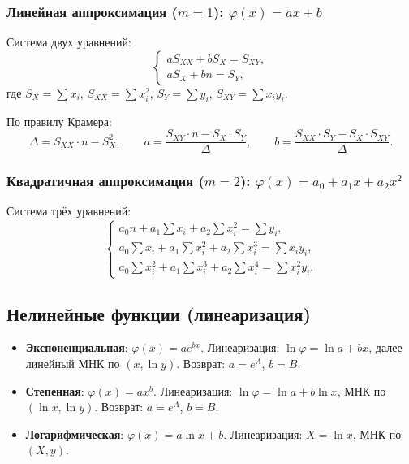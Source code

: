 \documentclass[a4paper,12pt]{article}
\begin{document}
\subsubsection{Линейная аппроксимация ($m=1$): $\varphi(x) = ax + b$}

Система двух уравнений:
\[
\begin{cases}
a S_{XX} + b S_X = S_{XY}, \\
a S_X + b n = S_Y,
\end{cases}
\]
где $S_X = \sum x_i$, $S_{XX} = \sum x_i^2$, $S_Y = \sum y_i$, $S_{XY} = \sum x_i y_i$.

По правилу Крамера:
\[
    \Delta = S_{XX}\cdot n - S_X^2, \qquad
    a = \frac{S_{XY}\cdot n - S_X\cdot S_Y}{\Delta}, \qquad
    b = \frac{S_{XX}\cdot S_Y - S_X\cdot S_{XY}}{\Delta}.
\]

\subsubsection{Квадратичная аппроксимация ($m=2$): $\varphi(x) = a_0 + a_1 x + a_2 x^2$}

Система трёх уравнений:
\[
\begin{cases}
a_0 n + a_1 \sum x_i + a_2 \sum x_i^2 = \sum y_i, \\
a_0 \sum x_i + a_1 \sum x_i^2 + a_2 \sum x_i^3 = \sum x_i y_i, \\
a_0 \sum x_i^2 + a_1 \sum x_i^3 + a_2 \sum x_i^4 = \sum x_i^2 y_i.
\end{cases}
\]

\subsection{Нелинейные функции (линеаризация)}

\begin{itemize}
    \item \textbf{Экспоненциальная}: $\varphi(x) = a e^{bx}$.
    Линеаризация: $\ln\varphi = \ln a + bx$, далее линейный МНК по $(x, \ln y)$.
    Возврат: $a = e^A$, $b = B$.

    \item \textbf{Степенная}: $\varphi(x) = a x^b$.
    Линеаризация: $\ln\varphi = \ln a + b\ln x$, МНК по $(\ln x, \ln y)$.
    Возврат: $a = e^A$, $b = B$.

    \item \textbf{Логарифмическая}: $\varphi(x) = a\ln x + b$.
    Линеаризация: $X = \ln x$, МНК по $(X, y)$.
\end{itemize}
\end{document}
